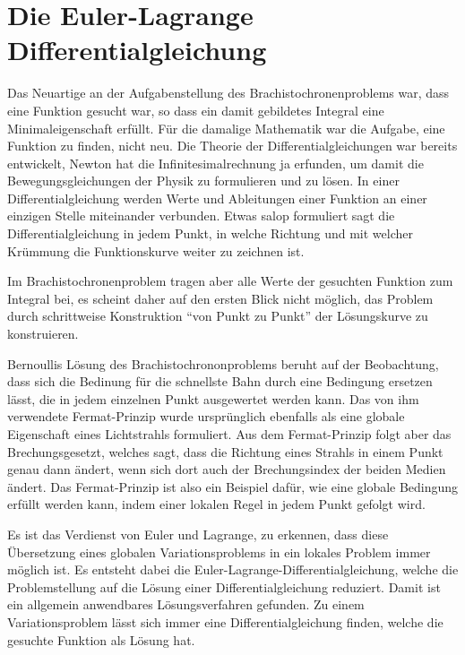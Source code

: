 %
%
%
\section{Die Euler-Lagrange Differentialgleichung
\label{buch:variation:section:eulerlagrange}}
Das Neuartige an der Aufgabenstellung des Brachistochronenproblems
war, dass eine Funktion gesucht war, so dass ein damit gebildetes
Integral eine Minimaleigenschaft erfüllt.
Für die damalige Mathematik war die Aufgabe, eine Funktion zu finden,
nicht neu.
Die Theorie der Differentialgleichungen war bereits entwickelt,
Newton hat die Infinitesimalrechnung ja erfunden, um damit die
Bewegungsgleichungen der Physik zu formulieren und zu lösen.
In einer Differentialgleichung werden Werte und Ableitungen einer
Funktion an einer einzigen Stelle miteinander verbunden.
Etwas salop formuliert sagt die Differentialgleichung in jedem
Punkt, in welche Richtung und mit welcher Krümmung die Funktionskurve
weiter zu zeichnen ist.

Im Brachistochronenproblem tragen aber alle Werte der gesuchten
Funktion zum Integral bei, es scheint daher auf den ersten Blick
nicht möglich, das Problem durch schrittweise Konstruktion
``von Punkt zu Punkt'' der Lösungskurve zu konstruieren.

Bernoullis Lösung des Brachistochrononproblems beruht auf der
Beobachtung, dass sich die Bedinung für die schnellste Bahn
durch eine Bedingung ersetzen lässt, die in jedem einzelnen
Punkt ausgewertet werden kann.
Das von ihm verwendete Fermat-Prinzip wurde ursprünglich ebenfalls
als eine globale Eigenschaft eines Lichtstrahls formuliert.
Aus dem Fermat-Prinzip folgt aber das Brechungsgesetzt, welches
sagt, dass die Richtung eines Strahls in einem Punkt genau dann
ändert, wenn sich dort auch der Brechungsindex der beiden Medien
ändert.
Das Fermat-Prinzip ist also ein Beispiel dafür, wie eine globale
Bedingung erfüllt werden kann, indem einer lokalen Regel in jedem
Punkt gefolgt wird.

Es ist das Verdienst von Euler und Lagrange, zu erkennen, dass diese
Übersetzung eines globalen Variationsproblems in ein lokales 
Problem immer möglich ist.
Es entsteht dabei die Euler-Lagrange-Differentialgleichung, welche
die Problemstellung auf die Lösung einer Differentialgleichung
reduziert.
Damit ist ein allgemein anwendbares Lösungsverfahren gefunden.
Zu einem Variationsproblem lässt sich immer eine Differentialgleichung
finden, welche die gesuchte Funktion als Lösung hat.

